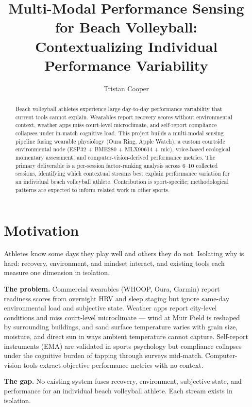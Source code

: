 \documentclass[sigconf,nonacm]{acmart}
\title{Multi-Modal Performance Sensing for Beach Volleyball: \\ Contextualizing Individual Performance Variability}
\author{Tristan Cooper}
\affiliation{%
  \institution{UC San Diego}
  \city{La Jolla}
  \state{CA}
  \country{USA}
}
\begin{document}
\begin{abstract}
Beach volleyball athletes experience large day-to-day performance variability that current tools cannot explain. Wearables report recovery scores without environmental context, weather apps miss court-level microclimate, and self-report compliance collapses under in-match cognitive load. This project builds a multi-modal sensing pipeline fusing wearable physiology (Oura Ring, Apple Watch), a custom courtside environmental node (ESP32 + BME280 + MLX90614 + mic), voice-based ecological momentary assessment, and computer-vision-derived performance metrics. The primary deliverable is a per-session factor-ranking analysis across 6--10 collected sessions, identifying which contextual streams best explain performance variation for an individual beach volleyball athlete. Contribution is sport-specific; methodological patterns are expected to inform related work in other sports.
\end{abstract}

\maketitle

\section{Motivation}

Athletes know some days they play well and others they do not. Isolating why is hard: recovery, environment, and mindset interact, and existing tools each measure one dimension in isolation.

\textbf{The problem.} Commercial wearables (WHOOP, Oura, Garmin) report readiness scores from overnight HRV and sleep staging but ignore same-day environmental load and subjective state. Weather apps report city-level conditions and miss court-level microclimate --- wind at Muir Field is reshaped by surrounding buildings, and sand surface temperature varies with grain size, moisture, and direct sun in ways ambient temperature cannot capture. Self-report instruments (EMA) are validated in sports psychology but compliance collapses under the cognitive burden of tapping through surveys mid-match. Computer-vision tools extract objective performance metrics with no context.

\textbf{The gap.} No existing system fuses recovery, environment, subjective state, and performance for an individual beach volleyball athlete. Each stream exists in isolation.
\end{document}
